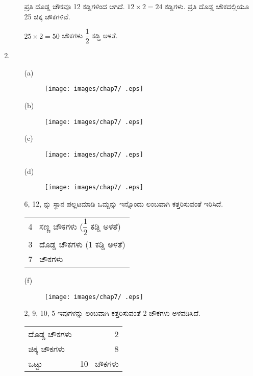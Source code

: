 \begin{enumerate}
\begin{itemize}
ಪ್ರತಿ ದೊಡ್ಡ ಚೌಕವೂ 12 ಕಡ್ಡಿಗಳಿಂದ ಆಗಿದೆ. $12 \times 2 = 24$ ಕಡ್ಡಿಗಳು. ಪ್ರತಿ ದೊಡ್ಡ ಚೌಕದಲ್ಲಿಯೂ 25 ಚಿಕ್ಕ ಚೌಕಗಳಿವೆ. 

$25\times 2 = 50$ ಚೌಕಗಳು $\dfrac{1}{2}$ ಕಡ್ಡಿ ಅಳತೆ. 
\end{itemize}

\item 
\begin{itemize}
\item [(a)]
\begin{figure}[!h]
\centering
\texttt{[image: images/chap7/ .eps]}
\end{figure}

\item[(b)]
\begin{figure}[!h]
\centering
\texttt{[image: images/chap7/ .eps]}
\end{figure}

\item[(c)]
\begin{figure}[!h]
\centering
\texttt{[image: images/chap7/ .eps]}
\end{figure}

\item[(d)]
\begin{figure}[!h]
\centering
\texttt{[image: images/chap7/ .eps]}
\end{figure}

6, 12, ನ್ನು ಸ್ಥಾನ ಪಲ್ಲಟಮಾಡಿ ಒಮ್ದನ್ನು ಇನ್ನೊಂದು ಲಂಬವಾಗಿ ಕತ್ತರಿಸುವಂತೆ ಇರಿಸಿದೆ. 

\begin{tabular}{l}
4~ ಸಣ್ಣ ಚೌಕಗಳು ($\dfrac{1}{2}$ ಕಡ್ಡಿ ಅಳತೆ) \\
3~ ದೊಡ್ಡ ಚೌಕಗಳು (1 ಕಡ್ಡಿ ಅಳತೆ)\\
\hline
7~ ಚೌಕಗಳು\\
\hline
\end{tabular}

\item[(f)]
\begin{figure}[!h]
\centering
\texttt{[image: images/chap7/ .eps]}
\end{figure}

2, 9, 10, 5 ಇವುಗಳನ್ನು ಲಂಬವಾಗಿ ಕತ್ತರಿಸುವಂತೆ 2 ಚೌಕಗಳು ಅಳವಡಿಸಿದೆ. 

\begin{tabular}{lr}
ದೊಡ್ಡ ಚೌಕಗಳು & 2\\
ಚಿಕ್ಕ ಚೌಕಗಳು & 8\\
\hline
ಒಟ್ಟು & 10~ ಚೌಕಗಳು \\
\hline
\end{tabular}
\end{itemize}


\end{enumerate}
